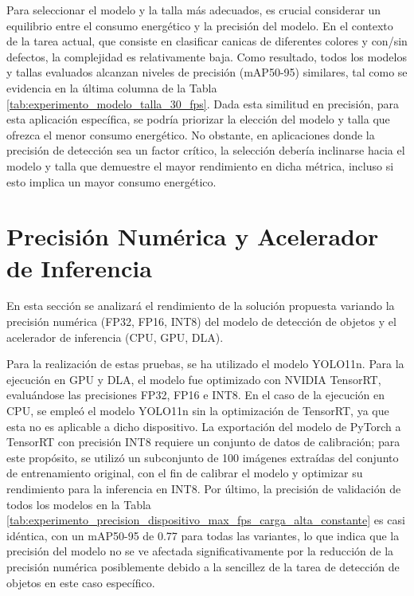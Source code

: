 \documentclass[11pt,spanish,listoffigures,listoftables]{tfgetsinf}
\begin{document}
Para seleccionar el modelo y la talla más adecuados, es crucial considerar un equilibrio entre el consumo energético y la precisión del modelo. En el contexto de la tarea actual, que consiste en clasificar canicas de diferentes colores y con/sin defectos, la complejidad es relativamente baja.
Como resultado, todos los modelos y tallas evaluados alcanzan niveles de precisión (mAP50-95) similares, tal como se evidencia en la última columna de la Tabla \ref{tab:experimento_modelo_talla_30_fps}.
Dada esta similitud en precisión, para esta aplicación específica, se podría priorizar la elección del modelo y talla que ofrezca el menor consumo energético.
No obstante, en aplicaciones donde la precisión de detección sea un factor crítico, la selección debería inclinarse hacia el modelo y talla que demuestre el mayor rendimiento en dicha métrica, incluso si esto implica un mayor consumo energético.



\section{Precisión Numérica y Acelerador de Inferencia} \label{sub:precision_numerica_dispositivo}
En esta sección se analizará el rendimiento de la solución propuesta variando la precisión numérica (FP32, FP16, INT8) del modelo de detección de objetos y el acelerador de inferencia (CPU, GPU, DLA).

Para la realización de estas pruebas, se ha utilizado el modelo YOLO11n. Para la ejecución en GPU y DLA, el modelo fue optimizado con NVIDIA TensorRT, evaluándose las precisiones FP32, FP16 e INT8. En el caso de la ejecución en CPU, se empleó el modelo YOLO11n sin la optimización de TensorRT, ya que esta no es aplicable a dicho dispositivo. La exportación del modelo de PyTorch a TensorRT con precisión INT8 requiere un conjunto de datos de calibración; para este propósito, se utilizó un subconjunto de 100 imágenes extraídas del conjunto de entrenamiento original, con el fin de calibrar el modelo y optimizar su rendimiento para la inferencia en INT8. Por último, la precisión de validación de todos los modelos en la Tabla \ref{tab:experimento_precision_dispositivo_max_fps_carga_alta_constante} es casi idéntica, con un mAP50-95 de 0.77 para todas las variantes, lo que indica que la precisión del modelo no se ve afectada significativamente por la reducción de la precisión numérica posiblemente debido a la sencillez de la tarea de detección de objetos en este caso específico.
\end{document}
